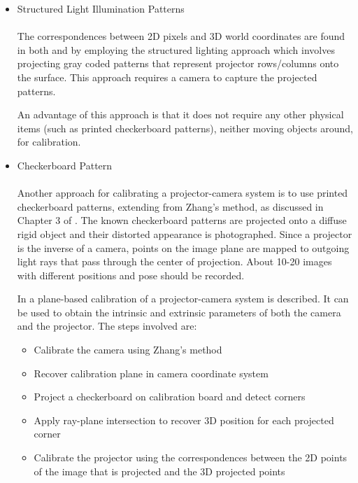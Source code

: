 \documentclass[]{article}
\begin{document}
\begin{itemize}
\item Structured Light Illumination Patterns
\\
\\The correspondences between 2D pixels and 3D world coordinates are found in both \cite{radhwan11} and \cite{yamazaki11} by employing the structured lighting approach which involves projecting gray coded patterns that represent projector rows/columns onto the surface. This approach requires a camera to capture the projected patterns.

An advantage of this approach is that it does not require any other physical items (such as printed checkerboard patterns), neither moving objects around, for calibration.\\
\item Checkerboard Pattern\\
\\Another approach for calibrating a projector-camera system is to use printed checkerboard patterns, extending from Zhang's method, as discussed in Chapter 3 of \cite{lanman09}. The known checkerboard patterns are projected onto a diffuse rigid object and their distorted appearance is photographed. Since a projector is the inverse of a camera, points on the image plane are mapped to outgoing light rays that pass through the center of projection. About 10-20 images with different positions and pose should be recorded.

In \cite{falcao08} a plane-based calibration of a projector-camera system is described. It can be used to obtain the intrinsic and extrinsic parameters of both the camera and the projector. The steps involved are:
\begin{itemize}
\item Calibrate the camera using Zhang's method
\item Recover calibration plane in camera coordinate system
\item Project a checkerboard on calibration board and detect corners
\item Apply ray-plane intersection to recover 3D position for each projected corner
\item Calibrate the projector using the correspondences between the 2D points of the image that is projected and the 3D projected points
\end{itemize}



\end{itemize}
\end{document}
